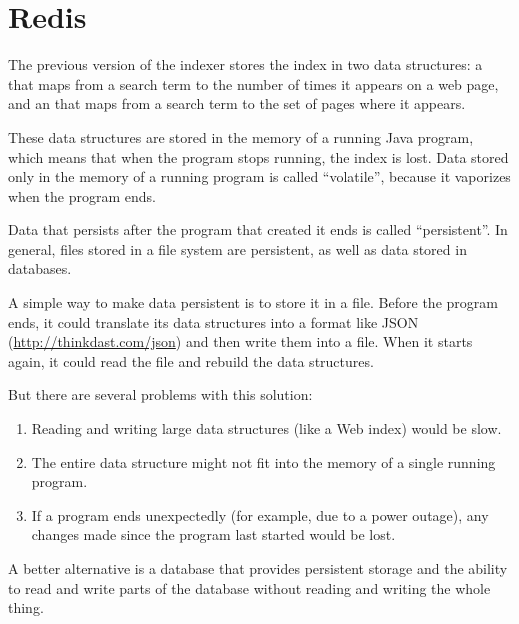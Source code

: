 \documentclass[12pt]{book}
\theoremstyle{exercise}
\begin{document}
\section{Redis}
\label{redis}


The previous version of the indexer stores the index in two data
structures: a  that maps from a search term to the
number of times it appears on a web page, and an  that
maps from a search term to the set of pages where it appears.

These data structures are stored in the memory of a running Java
program, which means that when the program stops running, the index is
lost. Data stored only in the memory of a running program is called
``volatile'', because it vaporizes when the program ends.


Data that persists after the program that created it ends is called
``persistent''. In general, files stored in a file system are
persistent, as well as data stored in databases.


A simple way to make data persistent is to store it in a file. Before
the program ends, it could translate its data structures into a format
like JSON (\url{http://thinkdast.com/json}) and then write them
into a file. When it starts again, it could read the file and rebuild
the data structures.

But there are several problems with this solution:

\begin{enumerate}
\item
  Reading and writing large data structures (like a Web index) would be
  slow.

\item
  The entire data structure might not fit into the memory of a single
  running program.

\item
  If a program ends unexpectedly (for example, due to a power outage),
  any changes made since the program last started would be lost.

\end{enumerate}

A better alternative is a database that provides persistent storage and
the ability to read and write parts of the database without reading and
writing the whole thing.
\end{document}

